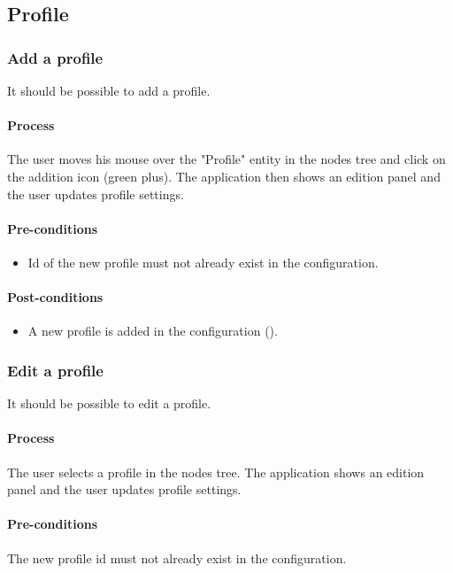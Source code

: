 \documentclass[11pt,a4paper,oneside]{article}
\begin{document}
\subsection{Profile}

\subsubsection{Add a profile}
It should be possible to add a profile.

\paragraph{Process}
The user moves his mouse over the "Profile" entity in the nodes tree and click on the addition icon (green plus). The application then shows an edition panel and the user updates profile settings.

\paragraph{Pre-conditions}
\begin{itemize}
	\item Id of the new profile must not already exist in the configuration.
\end{itemize}

\paragraph{Post-conditions}
\begin{itemize}
	\item A new profile is added in the configuration ().
\end{itemize}

\subsubsection{Edit a profile}
It should be possible to edit a profile.

\paragraph{Process}
The user selects a profile in the nodes tree. The application shows an edition panel and the user updates profile settings.

\paragraph{Pre-conditions}
The new profile id must not already exist in the configuration.
\end{document}
